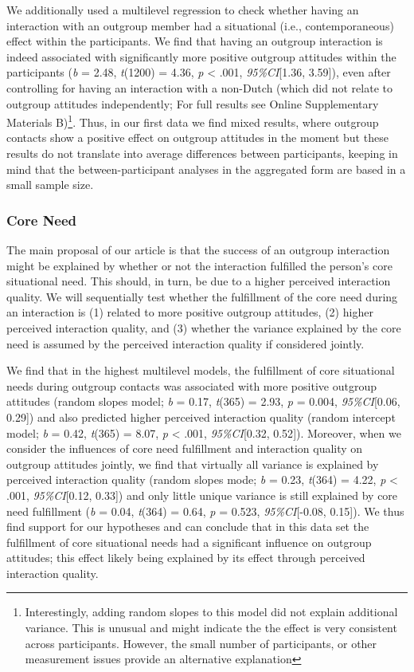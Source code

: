 We additionally used a multilevel regression to check whether having an
interaction with an outgroup member had a situational (i.e.,
contemporaneous) effect within the participants. We find that having an
outgroup interaction is indeed associated with significantly more
positive outgroup attitudes within the participants (\textit{b} = 2.48,
\textit{t}(1200) = 4.36, \textit{p} \textless{} .001,
\textit{95\%CI}{[}1.36, 3.59{]}), even after controlling for having an
interaction with a non-Dutch (which did not relate to outgroup attitudes
independently; For full results see Online Supplementary Materials
B)\footnote{Interestingly, adding random slopes to this model did not explain additional variance. This is unusual and might indicate the the effect is very consistent across participants. However, the small number of participants, or other measurement issues provide an alternative explanation}.
Thus, in our first data we find mixed results, where outgroup contacts
show a positive effect on outgroup attitudes in the moment but these
results do not translate into average differences between participants,
keeping in mind that the between-participant analyses in the aggregated
form are based in a small sample size.

\subsubsection{Core Need}

The main proposal of our article is that the success of an outgroup
interaction might be explained by whether or not the interaction
fulfilled the person's core situational need. This should, in turn, be
due to a higher perceived interaction quality. We will sequentially test
whether the fulfillment of the core need during an interaction is (1)
related to more positive outgroup attitudes, (2) higher perceived
interaction quality, and (3) whether the variance explained by the core
need is assumed by the perceived interaction quality if considered
jointly.

We find that in the highest multilevel models, the fulfillment of core
situational needs during outgroup contacts was associated with more
positive outgroup attitudes (random slopes model; \textit{b} = 0.17,
\textit{t}(365) = 2.93, \textit{p} = 0.004, \textit{95\%CI}{[}0.06,
0.29{]}) and also predicted higher perceived interaction quality (random
intercept model; \textit{b} = 0.42, \textit{t}(365) = 8.07, \textit{p}
\textless{} .001, \textit{95\%CI}{[}0.32, 0.52{]}). Moreover, when we
consider the influences of core need fulfillment and interaction quality
on outgroup attitudes jointly, we find that virtually all variance is
explained by perceived interaction quality (random slopes mode;
\textit{b} = 0.23, \textit{t}(364) = 4.22, \textit{p} \textless{} .001,
\textit{95\%CI}{[}0.12, 0.33{]}) and only little unique variance is
still explained by core need fulfillment (\textit{b} = 0.04,
\textit{t}(364) = 0.64, \textit{p} = 0.523, \textit{95\%CI}{[}-0.08,
0.15{]}). We thus find support for our hypotheses and can conclude that
in this data set the fulfillment of core situational needs had a
significant influence on outgroup attitudes; this effect likely being
explained by its effect through perceived interaction quality.

